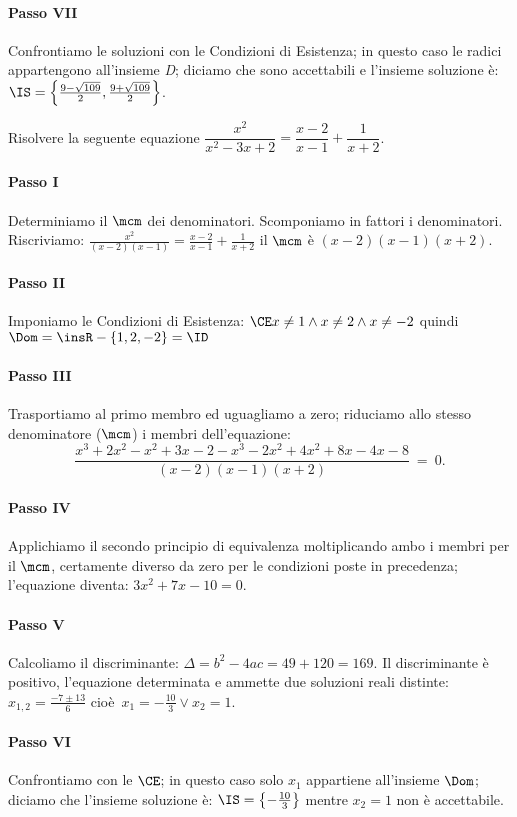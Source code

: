 \begin{exrig}
\begin{esempio}
 \paragraph{Passo VII} Confrontiamo le soluzioni con le Condizioni di Esistenza; in questo caso le radici appartengono all’insieme \emph{D}; diciamo che sono accettabili e l’insieme soluzione è: $\IS=\left\{\frac{9 - \sqrt{109}}{2}, \frac{9 +\sqrt{109}}{2} \right\}$.
 \end{esempio}

 \begin{esempio}
Risolvere la seguente equazione $\dfrac{x^{2}}{x^{2} - 3 x + 2}=\dfrac{x - 2}{x - 1} +\dfrac{1}{x + 2}$.
 \paragraph{Passo I} Determiniamo il $\mcm$ dei denominatori. Scomponiamo in fattori i denominatori. Riscriviamo: $\frac{x^{2}}{( x - 2 ) ( x - 1 )}=\frac{x - 2}{x - 1} +\frac{1}{x + 2}$ il $\mcm$ è $( x - 2 ) ( x - 1 ) ( x + 2 )$.
 \paragraph{Passo II} Imponiamo le Condizioni di Esistenza: $\CE x \neq 1 \wedge x \neq 2 \wedge x \neq - 2$ quindi $\Dom = \insR - \{ 1, 2, - 2 \}=\ID$
 \paragraph{Passo III} Trasportiamo al primo membro ed uguagliamo a zero; riduciamo allo stesso denominatore ($\mcm$) i membri dell’equazione: 
\[\frac{x^{3} + 2 x^{2} - x^{2} + 3 x - 2 - x^{3} - 2 x^{2} + 4x^{2} + 8 x - 4 x - 8}{( x - 2 ) ( x - 1 ) ( x + 2 )}~=~0.\]
 \paragraph{Passo IV} Applichiamo il secondo principio di equivalenza moltiplicando ambo i membri per il $\mcm$, certamente diverso da zero per le condizioni poste in precedenza; l’equazione diventa: $3 x^{2} + 7 x - 10 = 0$.
 \paragraph{Passo V} Calcoliamo il discriminante: $\Delta=b^{2} - 4 a c=49 + 120=169$. Il discriminante è positivo, l’equazione determinata e ammette due soluzioni reali distinte: $x_{1,2}=\frac{- 7 \pm 13}{6}$ cioè~$x_{1}=-\frac{10}{3} \vee x_{2}=1$.
 \paragraph{Passo VI} Confrontiamo con le $\CE$; in questo caso solo $x_{1}$ appartiene all’insieme $\Dom$; diciamo che l’insieme soluzione è: $\IS=\left\{-\frac{10}{3}\right\}$ mentre $x_{2} = 1$ non è accettabile.
\end{esempio}
\end{exrig}
